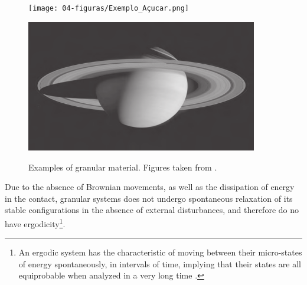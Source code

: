 \begin{figure}
\begin{minipage}{.45\linewidth}
            \label{subfig:exemplo_medicamento}
        \end{minipage}
        \begin{minipage}{.45\linewidth}
            \centering
            \texttt{[image: 04-figuras/Exemplo\_Açucar.png]}
            \label{subfig:exemplo_acucar}
        \end{minipage}
        \begin{minipage}{.45\linewidth}
            \centering
            \includegraphics[width=0.9\textwidth]{04-figuras/Exemplo_Saturno.png}
            \label{subfig:exemplo_saturno}
        \end{minipage}
        \caption{Examples of granular material. Figures taken from \cite{Granular_Media_Between_Fluid_and_Solid}.}
    \end{figure}


    Due to the absence of Brownian movements, as well as the dissipation of energy in the contact, granular systems does not undergo spontaneous relaxation of its stable configurations in the absence of external disturbances, and therefore do no have ergodicity\footnote{An ergodic system has the characteristic of moving between their micro-states of energy spontaneously, in intervals of time, implying that their states are all equiprobable when analyzed in a very long time \cite{Srdjan-Tese, Unifying_Concepts_in_Granular_Media_and_Glasses}.}.

